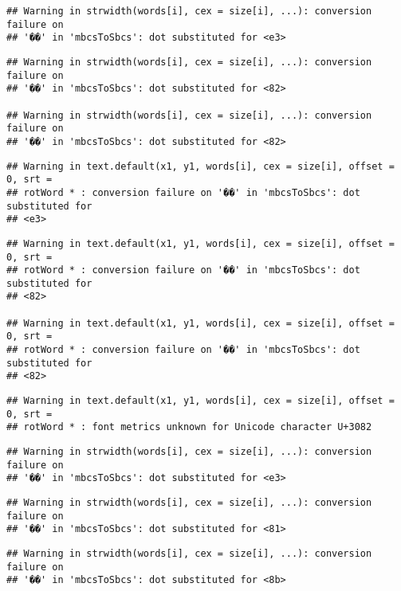 \documentclass[]{article}
\begin{document}
\begin{verbatim}
## Warning in strwidth(words[i], cex = size[i], ...): conversion failure on
## '��' in 'mbcsToSbcs': dot substituted for <e3>
\end{verbatim}

\begin{verbatim}
## Warning in strwidth(words[i], cex = size[i], ...): conversion failure on
## '��' in 'mbcsToSbcs': dot substituted for <82>

## Warning in strwidth(words[i], cex = size[i], ...): conversion failure on
## '��' in 'mbcsToSbcs': dot substituted for <82>
\end{verbatim}

\begin{verbatim}
## Warning in text.default(x1, y1, words[i], cex = size[i], offset = 0, srt =
## rotWord * : conversion failure on '��' in 'mbcsToSbcs': dot substituted for
## <e3>
\end{verbatim}

\begin{verbatim}
## Warning in text.default(x1, y1, words[i], cex = size[i], offset = 0, srt =
## rotWord * : conversion failure on '��' in 'mbcsToSbcs': dot substituted for
## <82>

## Warning in text.default(x1, y1, words[i], cex = size[i], offset = 0, srt =
## rotWord * : conversion failure on '��' in 'mbcsToSbcs': dot substituted for
## <82>
\end{verbatim}

\begin{verbatim}
## Warning in text.default(x1, y1, words[i], cex = size[i], offset = 0, srt =
## rotWord * : font metrics unknown for Unicode character U+3082
\end{verbatim}

\begin{verbatim}
## Warning in strwidth(words[i], cex = size[i], ...): conversion failure on
## '��' in 'mbcsToSbcs': dot substituted for <e3>
\end{verbatim}

\begin{verbatim}
## Warning in strwidth(words[i], cex = size[i], ...): conversion failure on
## '��' in 'mbcsToSbcs': dot substituted for <81>
\end{verbatim}

\begin{verbatim}
## Warning in strwidth(words[i], cex = size[i], ...): conversion failure on
## '��' in 'mbcsToSbcs': dot substituted for <8b>
\end{verbatim}
\end{document}
